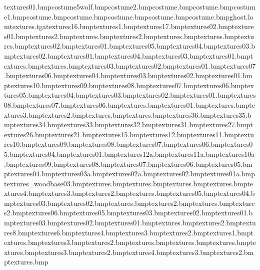 textures\sdomestrip01.bmp costume\eyetex5wolf.bmp costume\earslined2.bmp costume\noseshine.bmp costume\wolftongueline.bmp costume\wolfteeth1.bmp costume\wolfmuzzlestubble.bmp costume\wolffingers.bmp costume\wolfeyebrow.bmp costume\wolfbodytoes.bmp costume\wolfbodyeyebrow.bmp ghost.lom textures\ghostweb.tga textures\wpaper16.bmp textures\wbridge1.bmp textures\waterfall17.bmp textures\wanted02.bmp textures\wanted01.bmp textures\vpaintchair2.bmp textures\vpaintchair.bmp textures\vpaintbed2.bmp textures\trucktire.bmp textures\treeend.bmp textures\track.bmp textures\taztop02.bmp textures\taztop01.bmp textures\sub05.bmp textures\sub04.bmp textures\sub03.bmp textures\sub02.bmp textures\sub01.bmp textures\snowtree04.bmp textures\snowtree03.bmp textures\snowtree01.bmp textures\snowtree.bmp textures\snowtile.bmp textures\snowpole03.bmp textures\snowpole02.bmp textures\snowpole01.bmp textures\snowplank07.bmp textures\snowplank06.bmp textures\snowplank04.bmp textures\snowplank03.bmp textures\snowplank02.bmp textures\snowplank01.bmp textures\snowindow10.bmp textures\snowindow09.bmp textures\snowindow08.bmp textures\snowindow07.bmp textures\snowindow06.bmp textures\snowindow05.bmp textures\snowindow04.bmp textures\snowindow03.bmp textures\snowindow02.bmp textures\snowindow01.bmp textures\snowdecal08.bmp textures\snowdecal07.bmp textures\snowdecal06.bmp textures\snowblanket.bmp textures\snowbarber01.bmp textures\snow.bmp textures\slurp3.bmp textures\slurp2.bmp textures\slurp.bmp textures\sleeper.bmp textures\sign36.bmp textures\sign35.bmp textures\sign34.bmp textures\sign33.bmp textures\sign32.bmp textures\sign31.bmp textures\sign27.bmp textures\sign26.bmp textures\sign21.bmp textures\sign15.bmp textures\sdomestripi12.bmp textures\sdomestripi11.bmp textures\sdomestripi10.bmp textures\sdomestripi09.bmp textures\sdomestripi08.bmp textures\sdomestripi07.bmp textures\sdomestripi06.bmp textures\sdomestripi05.bmp textures\sdomestripi04.bmp textures\sdomestripi01.bmp textures\sdomestrip12a.bmp textures\sdomestrip11a.bmp textures\sdomestrip10a.bmp textures\sdomestrip09.bmp textures\sdomestrip08.bmp textures\sdomestrip07.bmp textures\sdomestrip06.bmp textures\sdomestrip05.bmp textures\sdomestrip04.bmp textures\sdomestrip03a.bmp textures\sdomestrip02a.bmp textures\sdomestrip02.bmp textures\sdomestrip01a.bmp textures\ammodump_woodbase03.bmp textures\rocketstripes.bmp textures\rocketlogo.bmp textures\postbox.bmp textures\poolside.bmp textures\plasticbox4.bmp textures\plasticbox3.bmp textures\plasticbox2.bmp textures\plasticbox.bmp textures\phone05.bmp textures\phone04.bmp textures\phone03.bmp textures\phone02.bmp textures\phone.bmp textures\milk2.bmp textures\milk.bmp textures\jukebox2.bmp textures\juke06.bmp textures\juke05.bmp textures\juke03.bmp textures\juke02.bmp textures\juke01.bmp textures\igloo03.bmp textures\igloo02.bmp textures\igloo01.bmp textures\icewafer.bmp textures\icewafe2.bmp textures\iceplank8.bmp textures\iceplank6.bmp textures\iceplank4.bmp textures\iceplank3.bmp textures\iceplank2.bmp textures\iceplank1.bmp textures\icelolly.bmp textures\iceloll3.bmp textures\iceloll2.bmp textures\hotdog.bmp textures\happymeal.bmp textures\hamplid.bmp textures\hampfood.bmp textures\hampfod3.bmp textures\hampfod2.bmp textures\hamper4.bmp textures\hamper3.bmp textures\hamper2.bmp textures\hamper.bmp 